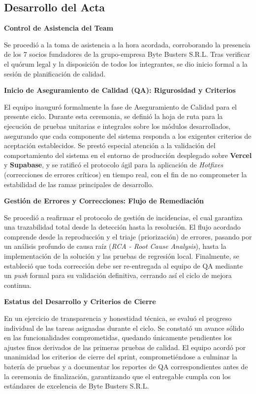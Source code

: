 \newpage
\subsection{Desarrollo del Acta}

\noindent \textbf{Control de Asistencia del Team}\par
Se procedió a la toma de asistencia a la hora acordada, corroborando la presencia de los 7 socios fundadores de la grupo-empresa Byte Busters S.R.L. Tras verificar el quórum legal y la disposición de todos los integrantes, se dio inicio formal a la sesión de planificación de calidad.

\vspace*{0.5cm}
\noindent \textbf{Inicio de Aseguramiento de Calidad (QA): Rigurosidad y Criterios}\par
El equipo inauguró formalmente la fase de Aseguramiento de Calidad para el presente ciclo. Durante esta ceremonia, se definió la hoja de ruta para la ejecución de pruebas unitarias e integrales sobre los módulos desarrollados, asegurando que cada componente del sistema responda a los exigentes criterios de aceptación establecidos. Se prestó especial atención a la validación del comportamiento del sistema en el entorno de producción desplegado sobre \textbf{Vercel} y \textbf{Supabase}, y se ratificó el protocolo ágil para la aplicación de \textit{Hotfixes} (correcciones de errores críticos) en tiempo real, con el fin de no comprometer la estabilidad de las ramas principales de desarrollo.

\vspace*{0.5cm}
\noindent \textbf{Gestión de Errores y Correcciones: Flujo de Remediación}\par
Se procedió a reafirmar el protocolo de gestión de incidencias, el cual garantiza una trazabilidad total desde la detección hasta la resolución. El flujo acordado comprende desde la reproducción y el triaje (priorización) de errores, pasando por un análisis profundo de causa raíz (\textit{RCA - Root Cause Analysis}), hasta la implementación de la solución y las pruebas de regresión local. Finalmente, se estableció que toda corrección debe ser re-entregada al equipo de QA mediante un \textit{push} formal para su validación definitiva, cerrando así el ciclo de mejora continua.

\vspace*{0.5cm}
\noindent \textbf{Estatus del Desarrollo y Criterios de Cierre}\par
En un ejercicio de transparencia y honestidad técnica, se evaluó el progreso individual de las tareas asignadas durante el ciclo. Se constató un avance sólido en las funcionalidades comprometidas, quedando únicamente pendientes los ajustes finos derivados de las primeras pruebas de calidad. El equipo acordó por unanimidad los criterios de cierre del sprint, comprometiéndose a culminar la batería de pruebas y a documentar los reportes de QA correspondientes antes de la ceremonia de finalización, garantizando que el entregable cumpla con los estándares de excelencia de Byte Busters S.R.L.

